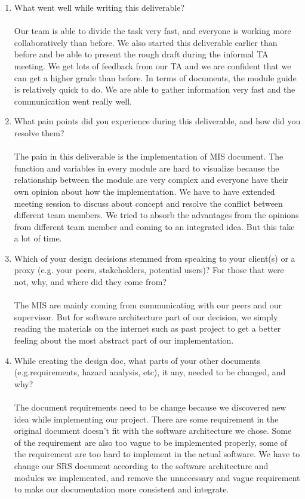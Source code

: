 \documentclass[12pt, titlepage]{article}
\begin{document}
\begin{enumerate}
  \item What went well while writing this deliverable? \\ \\
  Our team is able to divide the task very fast, and everyone is working more collaboratively than before. We also started this deliverable earlier than before and be able to present the rough draft during the informal TA meeting. We get lots of feedback from our TA and we are confident that we can get a higher grade than before. In terms of documents, the module guide is relatively quick to do. We are able to gather information very fast and the communication went really well.
  
  \item What pain points did you experience during this deliverable, and how did you resolve them?\\ \\
  The pain in this deliverable is the implementation of MIS document. The function and variables in every module are hard to visualize because the relationship between the module are very complex and everyone have their own opinion about how the implementation. We have to have extended meeting session to discuss about concept and resolve the conflict between different team members. We tried to absorb the advantages from the opinions from different team member and coming to an integrated idea. But this take a lot of time.
  
  \item Which of your design decisions stemmed from speaking to your client(s) or a proxy (e.g. your peers, stakeholders, potential users)? For those that were not, why, and where did they come from?\\ \\
  The MIS are mainly coming from communicating with our peers and our supervisor. But for software architecture part of our decision, we simply reading the materials on the internet such as past project to get a better feeling about the most abstract part of our implementation.
  
  \item While creating the design doc, what parts of your other documents (e.g.requirements, hazard analysis, etc), it any, needed to be changed, and why?\\ \\
  The document requirements need to be change because we discovered new idea while implementing our project. There are some requirement in the original document doesn't fit with the software architecture we chose. Some of the requirement are also too vague to be implemented properly, some of the requirement are too hard to implement in the actual software. We have to change our SRS document according to the software architecture and modules we implemented, and remove the unnecessary and vague requirement to make our documentation more consistent and integrate. 
  

\end{enumerate}
\end{document}
